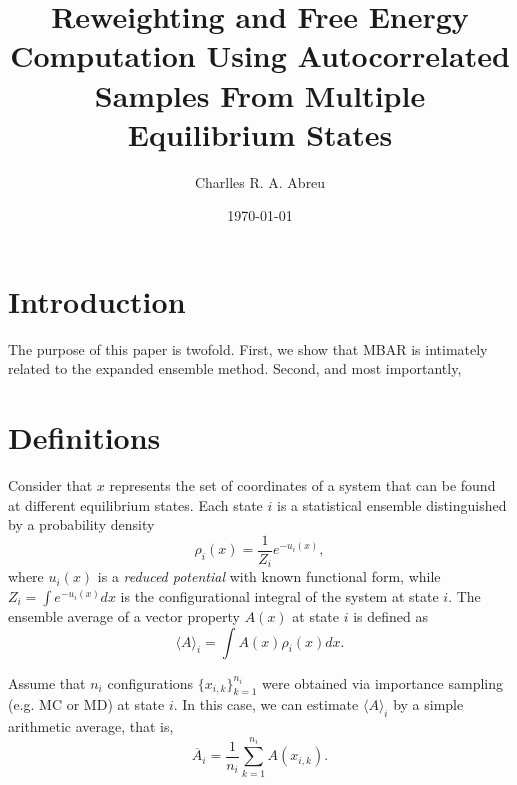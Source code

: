 \documentclass[aip,jcp,reprint,amsmath,amssymb]{revtex4-1}
\begin{document}
\title{Reweighting and Free Energy Computation Using Autocorrelated Samples From Multiple Equilibrium States}

\author{Charlles R. A. Abreu}

\date{\today}

\maketitle

\section{Introduction}
\label{sec:introduction}

The purpose of this paper is twofold. First, we show that MBAR is intimately related to the expanded ensemble method. Second, and most importantly, 

\section{Definitions}
\label{sec:definitions}

Consider that $x$ represents the set of coordinates of a system that can be found at different equilibrium states. Each state $i$ is a statistical ensemble distinguished by a probability density
\begin{equation}
\label{eq:state_prob_density}
\rho_i(x) = \frac{1}{Z_i} e^{-u_i(x)},
\end{equation}
where $u_i(x)$ is a \textit{reduced potential}\cite{Shirts_2008, Chodera_2011} with known functional form, while $Z_i = \int e^{-u_i(x)}dx$ is the configurational integral of the system at state $i$. The ensemble average of a vector property $A(x)$ at state $i$ is defined as
\begin{equation}
\label{eq:ensemble average}
\langle A \rangle_i = \int A(x)\rho_i(x)dx.
\end{equation}

Assume that $n_i$ configurations $\{x_{i,k}\}_{k=1}^{n_i}$ were obtained via importance sampling\cite{Allen_1987} (e.g. MC or MD) at state $i$. In this case, we can estimate $\langle A \rangle_i$ by a simple arithmetic average, that is,
\begin{equation}
\label{eq:average_estimator}
\overline A_i = \frac{1}{n_i} \sum_{k=1}^{n_i} A(x_{i,k}).
\end{equation}
\end{document}
